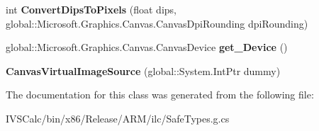 \begin{DoxyCompactItemize}
int {\bfseries Convert\+Dips\+To\+Pixels} (float dips, global\+::\+Microsoft.\+Graphics.\+Canvas.\+Canvas\+Dpi\+Rounding dpi\+Rounding)
\item 
\mbox{\label{class_microsoft_1_1_graphics_1_1_canvas_1_1_u_i_1_1_xaml_1_1_canvas_virtual_image_source_ab39af3b2bc0d7f39323c02fd27ab2531}} 
global\+::\+Microsoft.\+Graphics.\+Canvas.\+Canvas\+Device {\bfseries get\+\_\+\+Device} ()
\item 
\mbox{\label{class_microsoft_1_1_graphics_1_1_canvas_1_1_u_i_1_1_xaml_1_1_canvas_virtual_image_source_a514d9c30fbd43794543c3c86f1f45471}} 
{\bfseries Canvas\+Virtual\+Image\+Source} (global\+::\+System.\+Int\+Ptr dummy)
\end{DoxyCompactItemize}


The documentation for this class was generated from the following file\+:\begin{DoxyCompactItemize}
\item 
I\+V\+S\+Calc/bin/x86/\+Release/\+A\+R\+M/ilc/Safe\+Types.\+g.\+cs\end{DoxyCompactItemize}
